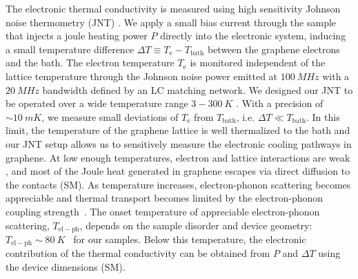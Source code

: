 The electronic thermal conductivity is measured using high sensitivity Johnson noise thermometry (JNT) \cite{fong_ultrasensitive_2012, crossno_development_2015}. We apply a small bias current through the sample that injects a joule heating power $P$ directly into the electronic system, inducing a small temperature difference $\Delta T\equiv T_{\mathrm{e}}-T_{\mathrm{bath}}$ between the graphene electrons and the bath. The electron temperature $T_{\mathrm{e}}$ is monitored independent of the lattice temperature through the Johnson noise power emitted at $100~MHz$ with a $20~MHz$ bandwidth defined by an LC matching network. We designed our JNT to be operated over a wide temperature range $3-300~K$ \cite{crossno_development_2015}. With a precision of $\sim 10~mK$, we measure small deviations of $T_{\mathrm{e}}$ from $T_{\mathrm{bath}}$, i.e. $\Delta T\ll T_{\mathrm{bath}}$. In this limit, the temperature of the graphene lattice is well thermalized to the bath \cite{fong_ultrasensitive_2012} and our JNT setup allows us to sensitively measure the electronic cooling pathways in graphene. At low enough temperatures, electron and lattice interactions are weak \cite{crossno_development_2015, fong_measurement_2013}, and most of the Joule heat generated in graphene escapes via direct diffusion to the contacts (SM). As temperature increases, electron-phonon scattering becomes appreciable and thermal transport becomes limited by the electron-phonon coupling strength~\cite{fong_measurement_2013, betz_hot_2012, mckitterick_electron-phonon_2016}. The onset temperature of appreciable electron-phonon scattering, $T_{\mathrm{el-ph}}$, depends on the sample disorder and device geometry: $T_{\mathrm{el-ph}}\sim80~K$~\cite{fong_measurement_2013, crossno_development_2015, yigen_wiedemannfranz_2014, laitinen_electron-phonon_2014} for our samples. Below this temperature, the electronic contribution of the thermal conductivity can be obtained from $P$ and $\Delta T$ using the device dimensions (SM).

